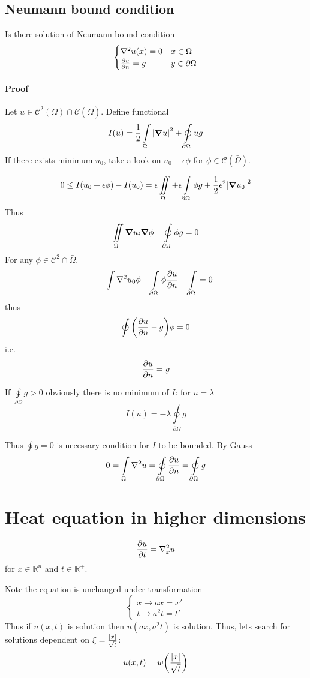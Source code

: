 \subsection{Neumann bound condition}
Is there solution of Neumann bound condition
$$\begin{cases}
\laplacian{u} (x) = 0 & x \in \Omega\\
\pdv{u}{n} (y)= g & y\in \partial \Omega
\end{cases}$$
\paragraph{Proof}
Let $ u \in \mathcal{C}^2(\Omega) \cap \mathcal{C} (\bar{\Omega})$. Define functional
$$I(u)  = \frac{1}{2} \int\limits_{\Omega} \abs{\grad{u}}^2 + \oint\limits_{\partial\Omega} ug $$ 
If there exists minimum $u_0$, take a look on $u_0 + \epsilon \phi$ for $\phi \in \mathcal{C}(\bar{\Omega})$.

$$0 \leq I(u_0+\epsilon \phi) - I(u_0) = \epsilon \iint\limits_{ \Omega} + \epsilon \int\limits_{\partial\Omega} \phi g +\frac{1}{2} \epsilon^2 \abs{\grad u_0}^2$$
Thus
$$\iint\limits_{ \Omega} \grad{u_i} \grad{\phi} - \oint\limits_{ \partial \Omega} \phi g = 0$$
For any $\phi \in \mathcal{C}^2 \cap \mathcal{\bar{\Omega}}$.
$$-\int \laplacian u_0 \phi + \int\limits_{ \partial \Omega} \phi \pdv{u}{n} - \int\limits_{ \partial \Omega} = 0$$
thus
$$\oint\qty(\pdv{u}{n}-g)\phi = 0$$
i.e.
$$\pdv{u}{n} = g$$




If $\oint\limits_{\partial \Omega} g>0 $ obviously there is no minimum of $I$:
for $u=\lambda$
$$I(u) = - \lambda \oint\limits_{\partial \Omega} g$$


Thus $\oint g = 0$ is necessary condition for $I$ to be bounded. By Gauss
$$0 = \int\limits_{ \Omega} \laplacian{u} = \oint\limits_{ \partial\Omega} \pdv{u}{n} = \oint\limits_{ \partial\Omega} g $$


\section{Heat equation in higher dimensions}
$$\pdv{u}{t} = \laplacian_x{u}$$
for $x\in \mathbb{R}^n$ and $t\in \mathbb{R}^+$.

Note the equation is unchanged under transformation 
$$\begin{cases}
x \to ax= x'\\
t \to a^2t = t'
\end{cases}$$
Thus if $u(x,t)$ is solution then $u(ax, a^2t)$ is solution. Thus, lets search for solutions dependent on
$\xi = \frac{\abs{x}}{\sqrt{t}}$:
$$u(x,t) = w\qty(\frac{\abs{x}}{\sqrt{t}})$$

